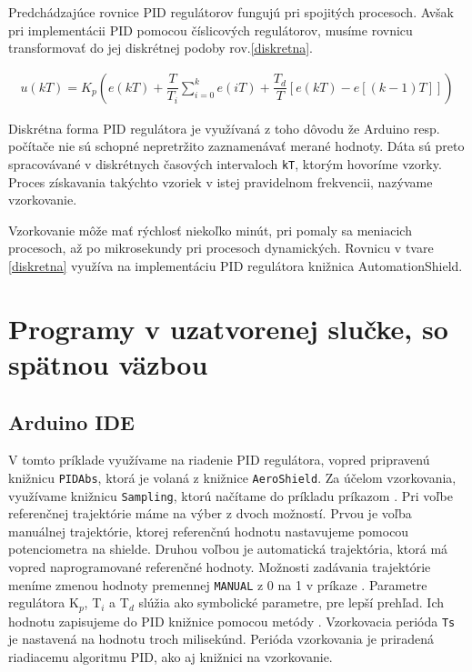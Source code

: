 Predchádzajúce rovnice PID regulátorov fungujú pri spojitých procesoch. Avšak pri implementácii PID pomocou číslicových regulátorov, musíme rovnicu transformovať do jej diskrétnej podoby rov.\ref{diskretna}.

\begin{align}
	\label{diskretna}
	u(kT)=K_p \left(e(kT) + \dfrac{T}{T_i} \sum_{i=0}^{k}  e(iT) + \dfrac{T_d}{T} \left[e(kT)-e \left[(k - 1)T\right] \right] \right)
\end{align}

Diskrétna forma PID regulátora je využívaná z toho dôvodu že Arduino resp. počítače nie sú schopné nepretržito zaznamenávať merané hodnoty. Dáta sú preto spracovávané v diskrétnych časových intervaloch \verb|kT|, ktorým hovoríme vzorky. Proces získavania takýchto vzoriek v istej pravidelnom frekvencii, nazývame vzorkovanie. 

Vzorkovanie môže mať rýchlosť niekoľko minút, pri pomaly sa meniacich procesoch, až po mikrosekundy pri procesoch dynamických. Rovnicu v tvare \ref{diskretna} využíva na implementáciu PID regulátora knižnica AutomationShield. 

\section{Programy v uzatvorenej slučke, so spätnou väzbou}
\subsection{Arduino IDE}
\label{sospatnou}
\label{Arduino IDE PID}

V tomto príklade využívame na riadenie PID regulátora, vopred pripravenú knižnicu \verb|PIDAbs|, ktorá je volaná z knižnice \verb|AeroShield|. Za účelom vzorkovania, využívame knižnicu \verb|Sampling|, ktorú načítame do príkladu príkazom . Pri voľbe referenčnej trajektórie máme na výber z dvoch možností. Prvou je voľba manuálnej trajektórie, ktorej referenčnú hodnotu nastavujeme pomocou potenciometra na shielde. Druhou voľbou je automatická trajektória, ktorá má vopred naprogramované referenčné hodnoty. Možnosti zadávania trajektórie meníme zmenou hodnoty premennej \verb|MANUAL| z 0 na 1 v príkaze . Parametre regulátora K$_p$, T$_i$ a T$_d$ slúžia ako symbolické parametre, pre lepší prehľad. Ich hodnotu zapisujeme do PID knižnice pomocou metódy . Vzorkovacia perióda \verb|Ts| je nastavená na hodnotu troch milisekúnd. Perióda vzorkovania je priradená riadiacemu algoritmu PID, ako aj knižnici na vzorkovanie. 

